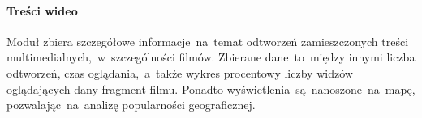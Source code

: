 \paragraph{Treści wideo}
Moduł zbiera szczegółowe informacje~na~temat odtworzeń zamieszczonych treści multimedialnych,~w~szczególności filmów. Zbierane dane~to~między innymi liczba odtworzeń, czas oglądania,~a~także wykres procentowy liczby widzów oglądających dany fragment filmu. Ponadto wyświetlenia~są~nanoszone~na~mapę, pozwalając~na~analizę popularności geograficznej.
